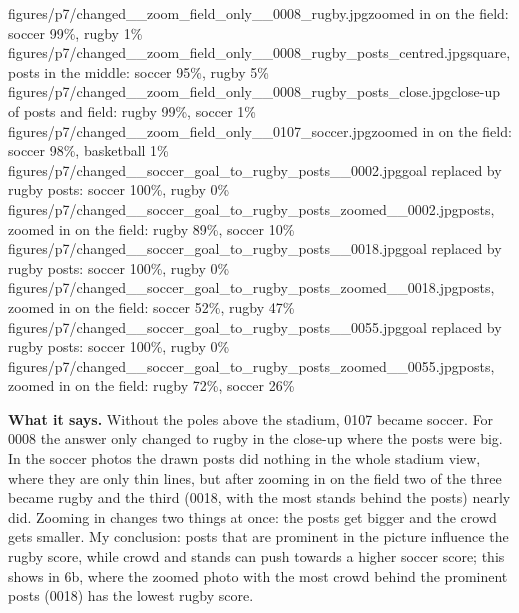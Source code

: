\documentclass[11pt]{article}
\begin{document}
           {figures/p7/changed__zoom_field_only__0008_rugby.jpg}{zoomed in on the field: soccer 99\%, rugby 1\%}
           {figures/p7/changed__zoom_field_only__0008_rugby_posts_centred.jpg}{square, posts in the middle: soccer 95\%, rugby 5\%}
           {figures/p7/changed__zoom_field_only__0008_rugby_posts_close.jpg}{close-up of posts and field: rugby 99\%, soccer 1\%}
           {figures/p7/changed__zoom_field_only__0107_soccer.jpg}{zoomed in on the field: soccer 98\%, basketball 1\%}
           {figures/p7/changed__soccer_goal_to_rugby_posts__0002.jpg}{goal replaced by rugby posts: soccer 100\%, rugby 0\%}
           {figures/p7/changed__soccer_goal_to_rugby_posts_zoomed__0002.jpg}{posts, zoomed in on the field: rugby 89\%, soccer 10\%}
           {figures/p7/changed__soccer_goal_to_rugby_posts__0018.jpg}{goal replaced by rugby posts: soccer 100\%, rugby 0\%}
           {figures/p7/changed__soccer_goal_to_rugby_posts_zoomed__0018.jpg}{posts, zoomed in on the field: soccer 52\%, rugby 47\%}
           {figures/p7/changed__soccer_goal_to_rugby_posts__0055.jpg}{goal replaced by rugby posts: soccer 100\%, rugby 0\%}
           {figures/p7/changed__soccer_goal_to_rugby_posts_zoomed__0055.jpg}{posts, zoomed in on the field: rugby 72\%, soccer 26\%}

\textbf{What it says.} Without the poles above the stadium, 0107 became soccer.
For 0008 the answer only changed to rugby in the close-up where the posts were big.
In the soccer photos the drawn posts did nothing in the whole stadium view, where
they are only thin lines, but after zooming in on the field two of the three
became rugby and the third (0018, with the most stands behind the posts) nearly
did. Zooming in changes two things at once: the posts get bigger and the crowd gets
smaller. My conclusion: posts that are prominent in the picture influence the
rugby score, while crowd and stands can push towards a higher soccer score; this
shows in 6b, where the zoomed photo with the most crowd behind the prominent posts
(0018) has the lowest rugby score.
\end{document}
